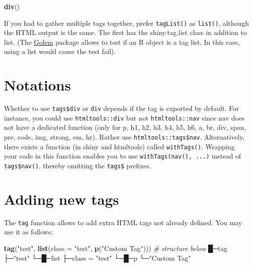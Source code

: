 \documentclass[
]{book}
\newenvironment{Shaded}{\begin{snugshade}}{\end{snugshade}}
\newcommand{\CommentTok}[1]{\textcolor[rgb]{0.56,0.35,0.01}{\textit{#1}}}
\newcommand{\DataTypeTok}[1]{\textcolor[rgb]{0.13,0.29,0.53}{#1}}
\newcommand{\KeywordTok}[1]{\textcolor[rgb]{0.13,0.29,0.53}{\textbf{#1}}}
\newcommand{\NormalTok}[1]{#1}
\newcommand{\StringTok}[1]{\textcolor[rgb]{0.31,0.60,0.02}{#1}}
\begin{document}
\begin{Shaded}
\begin{Highlighting}[]
\KeywordTok{div}\NormalTok{()}
\end{Highlighting}
\end{Shaded}

If you had to gather multiple tags together, prefer \texttt{tagList()} as \texttt{list()}, although the HTML output is the same. The first has the shiny.tag.list class in addition to list. (The \href{http://golemverse.org}{Golem} package allows to test if an R object is a tag list. In this case, using a list would cause the test fail).

\hypertarget{notations}{%
\section{Notations}\label{notations}}

Whether to use \texttt{tags\$div} or \texttt{div} depends if the tag is exported by default.
For instance, you could use \texttt{htmltools::div} but not \texttt{htmltools::nav} since nav does not have a dedicated function (only for p, h1, h2, h3, h4, h5, h6, a, br, div, span, pre, code, img, strong, em, hr).
Rather use \texttt{htmltools::tags\$nav}. Alternatively, there exists a function (in shiny and htmltools)
called \texttt{withTags()}. Wrapping your code in this function enables you to use \texttt{withTags(nav(),\ ...)} instead of \texttt{tags\$nav()}, thereby omitting the \texttt{tags\$} prefixes.

\hypertarget{adding-new-tags}{%
\section{Adding new tags}\label{adding-new-tags}}

The \texttt{tag} function allows to add extra HTML tags not already defined. You may use it as follows:

\begin{Shaded}
\begin{Highlighting}[]
\KeywordTok{tag}\NormalTok{(}\StringTok{"test"}\NormalTok{, }\KeywordTok{list}\NormalTok{(}\DataTypeTok{class =} \StringTok{"test"}\NormalTok{, }\KeywordTok{p}\NormalTok{(}\StringTok{"Custom Tag"}\NormalTok{)))}
\CommentTok{# structure below}
\NormalTok{█─tag }
\NormalTok{├─}\StringTok{"test"} 
\NormalTok{└─█─list }
\NormalTok{├─class =}\StringTok{ "test"} 
\NormalTok{└─█─p }
\NormalTok{└─}\StringTok{"Custom Tag"} 
\end{Highlighting}
\end{Shaded}
\end{document}

